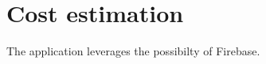 \chapter{Cost estimation}
\label{chap:costEstimation}
The application leverages the possibilty of Firebase.
